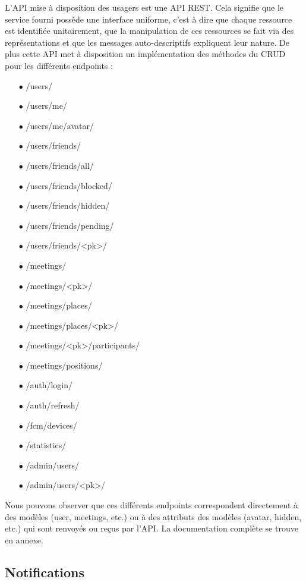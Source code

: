 \documentclass[french]{article}
\begin{document}
	L'API mise à disposition des usagers est une API REST. Cela signifie que le service fourni possède une interface uniforme, c'est à dire que chaque ressource est identifiée unitairement, que la manipulation de ces ressources se fait via des représentations et que les messages auto-descriptifs expliquent leur nature. De plus cette API met à disposition un implémentation des méthodes du CRUD pour les différents endpoints : 
	\begin{itemize}
		\item[$\bullet$] /users/
		\item[$\bullet$] /users/me/
		\item[$\bullet$] /users/me/avatar/
		\item[$\bullet$] /users/friends/
		\item[$\bullet$] /users/friends/all/
		\item[$\bullet$] /users/friends/blocked/
		\item[$\bullet$] /users/friends/hidden/
		\item[$\bullet$] /users/friends/pending/
		\item[$\bullet$] /users/friends/<pk>/
		\item[$\bullet$] /meetings/
		\item[$\bullet$] /meetings/<pk>/
		\item[$\bullet$] /meetings/places/
		\item[$\bullet$] /meetings/places/<pk>/
		\item[$\bullet$] /meetings/<pk>/participants/
		\item[$\bullet$] /meetings/positions/
		\item[$\bullet$] /auth/login/
		\item[$\bullet$] /auth/refresh/
		\item[$\bullet$] /fcm/devices/
		\item[$\bullet$] /statistics/
		\item[$\bullet$] /admin/users/
		\item[$\bullet$] /admin/users/<pk>/
	\end{itemize}
		
	Nous pouvons observer que ces différents endpoints correspondent directement à des modèles (user, meetings, etc.) ou à des attributs des modèles (avatar, hidden, etc.) qui sont renvoyés ou reçus par l'API. La documentation complète se trouve en annexe. 
	
	\subsection{Notifications}
\end{document}
